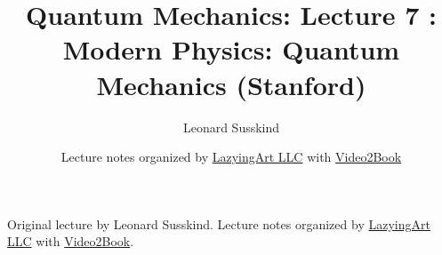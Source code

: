 \documentclass[11pt,oneside]{book}
\begin{document}
\frontmatter
\title{Quantum Mechanics: Lecture 7 : Modern Physics: Quantum Mechanics (Stanford)}
\author{Leonard Susskind}
\date{Lecture notes organized by \href{https://lazying.art}{LazyingArt LLC} with \href{https://github.com/lachlanchen/Video2Book}{Video2Book}}
\maketitle
\begin{center}
\small Original lecture by Leonard Susskind. Lecture notes organized by \href{https://lazying.art}{LazyingArt LLC} with \href{https://github.com/lachlanchen/Video2Book}{Video2Book}.
\end{center}
\clearpage
\mainmatter

\end{document}
